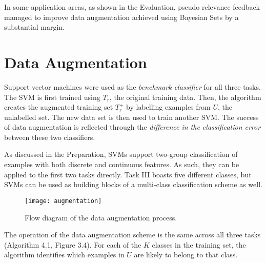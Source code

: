 \documentclass[12pt,twoside,notitlepage,amsart]{report} %
\begin{document}
	In some application areas, as shown in the Evaluation, pseudo relevance feedback managed to improve data augmentation achieved using Bayesian Sets by a substantial margin.
	
	\clearpage
	
	
	
	
	\section{Data Augmentation} 
	
	Support vector machines were used as the \emph{benchmark classifier} for all three tasks. The SVM is first trained using $T_r$, the original training data. Then, the algorithm creates the augmented training set $T_r^{+}$ by labelling examples from $U$, the unlabelled set. The new data set is then used to train another SVM. The success of data augmentation is reflected through the \emph{difference in the classification error} between these two classifiers. 
	
	As discussed in the Preparation, SVMs support two-group classification of examples with both discrete and continuous features. As such, they can be applied to the first two tasks directly. Task III boasts five different classes, but SVMs can be used as building blocks of a multi-class classification scheme as well.  
	
	\begin{figure}
	\texttt{[image: augmentation]}
	
	\caption{Flow diagram of the data augmentation process.}%
	\label{}%
	\end{figure}
	
	The operation of the data augmentation scheme is the same across all three tasks (Algorithm 4.1, Figure 3.4). For each of the $K$ classes in the training set, the algorithm identifies which examples in $U$ are likely to belong to that class. 
\end{document}
